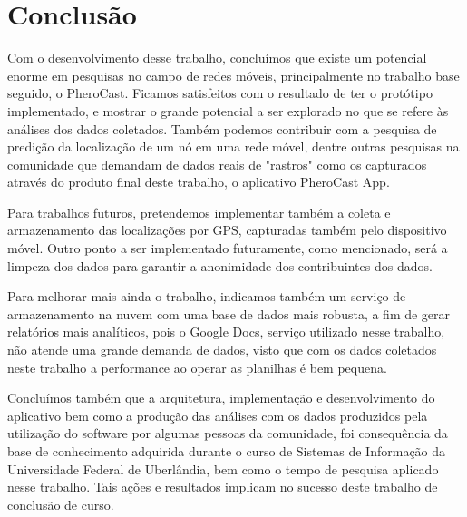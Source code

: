 \documentclass[12pt, %
openright, 
oneside,
a4paper,
brazil]{facom-ufu-abntex2}
\begin{document}

\chapter{Conclusão}




Com o desenvolvimento desse trabalho, concluímos que existe um potencial enorme em pesquisas no campo de redes móveis, principalmente no trabalho base seguido, o PheroCast. Ficamos satisfeitos com o resultado de ter o protótipo implementado, e mostrar o grande potencial a ser explorado no que se refere às análises dos dados coletados. Também podemos contribuir com a pesquisa de predição da localização de um nó em uma rede móvel, dentre outras pesquisas na comunidade que demandam de dados reais de "rastros" como os capturados através do produto final deste trabalho, o aplicativo PheroCast App.


Para trabalhos futuros, pretendemos implementar também a coleta e armazenamento das localizações por GPS, capturadas também pelo dispositivo móvel. Outro ponto a ser implementado futuramente, como mencionado, será a limpeza dos dados para garantir a anonimidade dos contribuintes dos dados.

Para melhorar mais ainda o trabalho, indicamos também um serviço de armazenamento na nuvem com uma base de dados mais robusta, a fim de gerar relatórios mais analíticos, pois o Google Docs, serviço utilizado nesse trabalho, não atende uma grande demanda de dados, visto que com os dados coletados neste trabalho a performance ao operar as planilhas é bem pequena. 

Concluímos também que a arquitetura, implementação e desenvolvimento do aplicativo bem como a produção das análises com os dados produzidos pela utilização do software por algumas pessoas da comunidade, foi consequência da base de conhecimento adquirida durante o curso de Sistemas de Informação da Universidade Federal de Uberlândia, bem como o tempo de pesquisa aplicado nesse trabalho. Tais ações e resultados implicam no sucesso deste trabalho de conclusão de curso.

\end{document}
